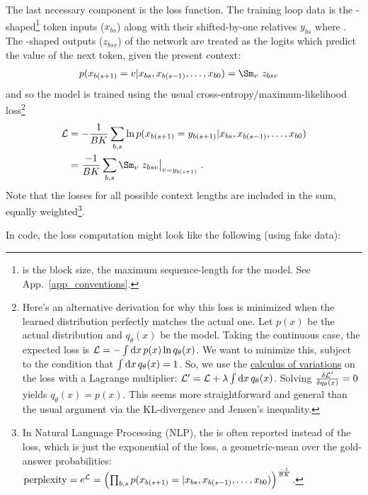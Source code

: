 \documentclass[11pt]{article}
\begin{document}
The last necessary component is the loss function. The training loop data is the
-shaped\footnote{ is the block size, the maximum sequence-length for
	the model. See App.~\ref{app_conventions}.}  token inputs ($ x _{ bs } $) along with their shifted-by-one relatives $ y
		_{ bs }$ where .  The -shaped
outputs ($ z _{ bsv } $)  of the  network are treated as the logits which
predict the value of the next token, given the present context:
\begin{align}
	p(x _{ b (s+1) }=v| x _{ b s }, x _{ b (s-1) }, \ldots, x _{ b 0 }) & = \Sm _{ v }\ z _{ bsv
		}\label{eq_transformer_conditional_prob}
\end{align}
and so the model is trained using the usual cross-entropy/maximum-likelihood loss\footnote{Here's an
    alternative derivation for why this loss is minimized when the learned distribution perfectly
    matches the actual one. Let $ p(x) $ be the actual distribution and $ q _{ \theta }(x) $ be the
    model. Taking the continuous case, the expected loss is $ \mathcal{L} = - \int {\rm d} x\, p(x)\ln q _{
    \theta}(x) $. We want to minimize this, subject to the condition that $ \int {\rm d} x\, q _{ \theta
    }(x) =1 $. So, we use the \href{https://en.wikipedia.org/wiki/Calculus_of_variations}{calculus
    of variations} on the loss with a Lagrange multiplier: $ \mathcal{L}' = \mathcal{L} + \lambda \int {\rm d} x\, q
_{ \theta }(x) $. Solving  $ \frac{ \delta \mathcal{L}' }{ \delta q _{ \theta }(x) }=0 $ yields $ q _{
\theta }(x) = p(x) $. This seems more straightforward and general than the usual argument via the
KL-divergence and Jensen's inequality. }
\begin{align}
	\Lcal & = -\frac{ 1 }{ BK }\sum _{ b,s }\ln p(x _{ b (s+1) }=y _{ b(s+1) }| x _{ b s }, x _{ b (s-1) },
	\ldots, x _{ b 0 })\nn
	      & = \frac{- 1 }{ BK }\sum _{ b,s }\Sm _{ v }\ z _{ bsv}\big| _{ v=y _{ b(s+1) } } \ .
\end{align}
Note that the losses for all possible context lengths are included in the sum, equally
weighted\footnote{In Natural Language Processing (NLP), the  is often reported
    instead of the loss, which is just the exponential of the loss, a geometric-mean over the
    gold-answer probabilities: $ {\rm perplexity} = e^{ \mathcal{L} } =\left (\prod _{ b, s }p(x _{ b
        (s+1) }=| x _{ b s }, x _{ b (s-1) }, \ldots, x _{ b 0 })\right ) ^{ \frac{ -1 }{ BK } }$.}.

In 
code, the loss computation might look like the following (using fake data):
\end{document}
